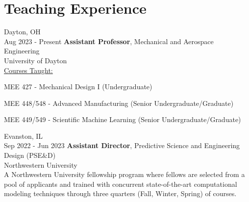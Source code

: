 \documentclass[11pt, letterpaper]{article}
\begin{document}
\section{Teaching Experience}
    
    \begin{twocolentry}{
        Dayton, OH\\
        Aug 2023 - Present
    }
        \textbf{Assistant Professor}, Mechanical and Aerospace Engineering\\
        University of Dayton\\
        \uline{Courses Taught:} 
            \begin{highlightsforbulletentries}
                \item MEE 427 - Mechanical Design I (Undergraduate)
                    \begin{highlightsforbulletentries}
                    \end{highlightsforbulletentries}
                \item MEE 448/548 - Advanced Manufacturing (Senior Undergraduate/Graduate)
                \begin{highlightsforbulletentries}
                    \end{highlightsforbulletentries}
                \item MEE 449/549 - Scientific Machine Learning (Senior Undergraduate/Graduate)
                    \begin{highlightsforbulletentries}
                    \end{highlightsforbulletentries}
            \end{highlightsforbulletentries}
    \end{twocolentry}
    \vspace{5 pt}

    \begin{twocolentry}{
        Evanston, IL\\
        Sep 2022 - Jun 2023
    }
        \textbf{Assistant Director}, Predictive Science and Engineering Design (PSE\&D)\\ Northwestern University\\
        A Northwestern University fellowship program where fellows are selected
from a pool of applicants and trained with concurrent state-of-the-art
computational modeling techniques through three quarters (Fall, Winter,
Spring) of courses.
    \end{twocolentry}
    \vspace{5 pt}
\end{document}
